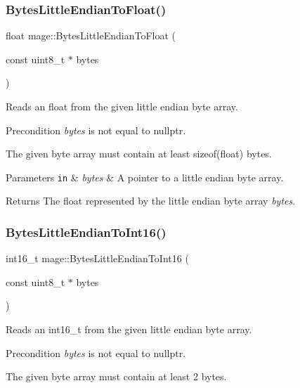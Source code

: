 \subsubsection{\texorpdfstring{Bytes\+Little\+Endian\+To\+Float()}{BytesLittleEndianToFloat()}}
{\footnotesize\ttfamily float mage\+::\+Bytes\+Little\+Endian\+To\+Float (\begin{DoxyParamCaption}\item[{const uint8\+\_\+t $\ast$}]{bytes }\end{DoxyParamCaption})}

Reads an float from the given little endian byte array.

\begin{DoxyPrecond}{Precondition}
{\itshape bytes} is not equal to {\ttfamily nullptr}. 

The given byte array must contain at least {\ttfamily sizeof(float)} bytes. 
\end{DoxyPrecond}

\begin{DoxyParams}[1]{Parameters}
\mbox{\tt in}  & {\em bytes} & A pointer to a little endian byte array. \\
\hline
\end{DoxyParams}
\begin{DoxyReturn}{Returns}
The {\ttfamily float} represented by the little endian byte array {\itshape bytes}. 
\end{DoxyReturn}
\hypertarget{namespacemage_ac391c9723ff006ce3e3f824108dbcc61}{}\label{namespacemage_ac391c9723ff006ce3e3f824108dbcc61} 
\subsubsection{\texorpdfstring{Bytes\+Little\+Endian\+To\+Int16()}{BytesLittleEndianToInt16()}}
{\footnotesize\ttfamily int16\+\_\+t mage\+::\+Bytes\+Little\+Endian\+To\+Int16 (\begin{DoxyParamCaption}\item[{const uint8\+\_\+t $\ast$}]{bytes }\end{DoxyParamCaption})}

Reads an int16\+\_\+t from the given little endian byte array.

\begin{DoxyPrecond}{Precondition}
{\itshape bytes} is not equal to {\ttfamily nullptr}. 

The given byte array must contain at least 2 bytes. 
\end{DoxyPrecond}

